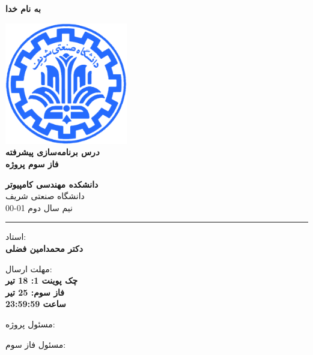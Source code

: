 \documentclass[]{article}
\begin{document}
\begin{titlepage}
\begin{center}

\textbf{ \Huge{به نام خدا} }
        
\vspace{0.2cm}

\includegraphics[width=0.4\textwidth]{sharif1.png}\\
\vspace{0.2cm}
\textbf{ \Huge{\emph درس برنامه‌سازی پیشرفته} }\\
\vspace{0.25cm}
\textbf{ \Large{ فاز سوم پروژه} }
\vspace{0.2cm}
       
 
      \large \textbf{دانشکده مهندسی کامپیوتر}\\\vspace{0.1cm}
    \large   دانشگاه صنعتی شریف\\\vspace{0.2cm}
       \large   ﻧﯿﻢ سال دوم 01-00 \\\vspace{0.10cm}
      \noindent\rule[1ex]{\linewidth}{1pt}
استاد:\\
    \textbf{{دکتر محمدامین فضلی}}



    \vspace{0.20cm}

   مهلت ارسال:\\
    \textbf{{چک پوینت 1: 18 تیر}}\\
    \textbf{{فاز سوم: 25 تیر}}\\
    \textbf{{ساعت 23:59:59}}

    \vspace{0.10cm}
مسئول پروژه:\\
    \textbf{}
    
        \vspace{0.10cm}
مسئول فاز سوم:\\
    \textbf{}
    

\end{center}
\end{titlepage}
\end{document}
